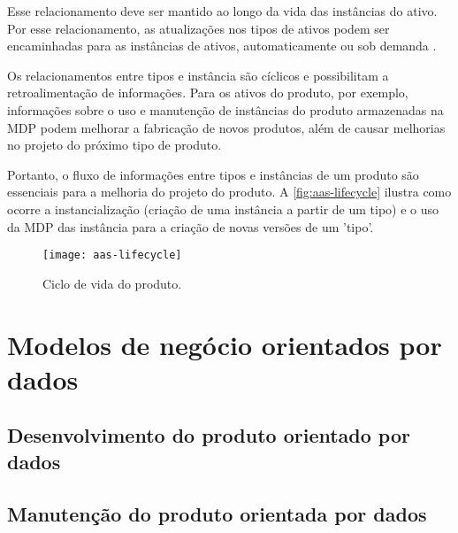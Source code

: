 	Esse relacionamento deve ser mantido ao longo da vida das instâncias do ativo. Por esse relacionamento, as atualizações nos tipos de ativos podem ser encaminhadas para as instâncias de ativos, automaticamente ou sob demanda \cite{bader2019aas}.
	
	Os relacionamentos entre tipos e instância são cíclicos e possibilitam a retroalimentação de informações. Para os ativos do produto, por exemplo, informações sobre o uso e manutenção de instâncias do produto armazenadas na MDP podem melhorar a fabricação de novos produtos, além de causar melhorias no projeto do próximo tipo de produto.
	
	Portanto, o fluxo de informações entre tipos e instâncias de um produto são essenciais para a melhoria do projeto do produto. A \autoref{fig:aas-lifecycle} ilustra como ocorre a instancialização (criação de uma instância a partir de um tipo) e o uso da MDP das instância para a criação de novas versões de um 'tipo'.
	
	\begin{figure}[htb!]
		\centering
		\caption{Ciclo de vida do produto.}
		\label{fig:aas-lifecycle}
		\texttt{[image: aas-lifecycle]}
	\end{figure}

\section{ Modelos de negócio orientados por dados }



\subsection{ Desenvolvimento do produto orientado por dados   }

\lipsum[1-1]

\subsection{ Manutenção do produto orientada por dados }

\lipsum[1-1]